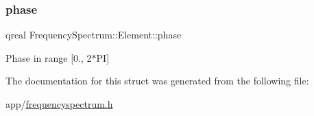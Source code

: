 \subsubsection{\texorpdfstring{phase}{phase}}
{\footnotesize\ttfamily qreal Frequency\+Spectrum\+::\+Element\+::phase}

Phase in range \mbox{[}0., 2$\ast$\+PI\mbox{]} 

The documentation for this struct was generated from the following file\+:\begin{DoxyCompactItemize}
\item 
app/\hyperlink{frequencyspectrum_8h}{frequencyspectrum.\+h}\end{DoxyCompactItemize}
